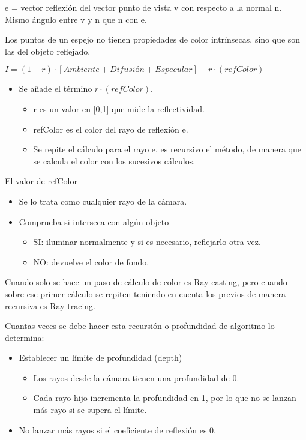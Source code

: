 e = vector reflexión del vector punto de vista v con respecto a la normal n. Mismo ángulo entre v y n que n con e.

Los puntos de un espejo no tienen propiedades de color intrínsecas, sino que son las del objeto reflejado.

$I=(1-r)\cdot[\textit{Ambiente}+\textit{Difusión}+\textit{Especular}]+r\cdot(refColor)$
\pagebreak

\begin{itemize}
	\item Se añade el término $r\cdot(refColor)$.
	      \begin{itemize}
		      \item r es un valor en [0,1] que mide la reflectividad.
		      \item refColor es el color del rayo de reflexión e.
		      \item Se repite el cálculo para el rayo e, es recursivo el método, de manera que se calcula el color con los sucesivos cálculos.
	      \end{itemize}
\end{itemize}

El valor de refColor
\begin{itemize}
	\item Se lo trata como cualquier rayo de la cámara.
	\item Comprueba si interseca con algún objeto
	      \begin{itemize}
		      \item SI: iluminar normalmente y si es necesario, reflejarlo otra vez.
		      \item NO: devuelve el color de fondo.
	      \end{itemize}
\end{itemize}

Cuando solo se hace un paso de cálculo de color es Ray-casting, pero cuando sobre ese primer cálculo se repiten teniendo en cuenta los previos de manera recursiva es Ray-tracing.

Cuantas veces se debe hacer esta recursión o profundidad de algoritmo lo determina:
\begin{itemize}
	\item Establecer un límite de profundidad (depth)
	      \begin{itemize}
		      \item Los rayos desde la cámara tienen una profundidad de 0.
		      \item Cada rayo hijo incrementa la profundidad en 1, por lo que no se lanzan más rayo si se supera el límite.
	      \end{itemize}
	\item No lanzar más rayos si el coeficiente de reflexión es 0.
\end{itemize}

